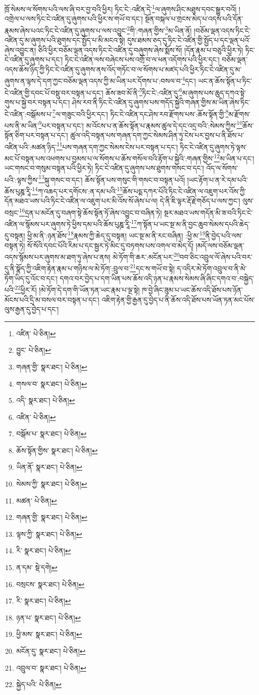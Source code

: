 ཁྲོ་སེམས་ལ་སོགས་པའི་ལས་ཞི་བར་བྱ་བའི་ཕྱིར། ཏིང་ངེ་:འཛིན་དེ་\footnote{འཛིན་  པེ་ཅིན། }ལ་ཞུགས་ཤིང་མཐུས་དབང་སྒྱུར་བའོ། །འགྲེལ་པ་ལས་ཏིང་ངེ་འཛིན་དུ་ཞུགས་པའི་ཕྱིར་ས་གཡོ་བ་དང་། སྔོན་བསྐལ་པ་གྲངས་མེད་པ་འདས་པའི་དོན་རྣམས་ཞེས་པའང་ཏིང་ངེ་འཛིན་དུ་ཞུགས་པ་ལས་འབྱུང་\footnote{བྱུང་  པེ་ཅིན། }གི་:གཞན་གྱིས་\footnote{གཞན་གྱི་  སྣར་ཐང་།  པེ་ཅིན། }མ་ཡིན་ནོ། །བཅོམ་ལྡན་འདས་ཏིང་ངེ་འཛིན་དུ་མ་ཞུགས་པའི་ཐུགས་དང་སྤྱོད་པ་མི་མངའ་སྟེ། དུས་ཐམས་ཅད་དུ་ཏིང་ངེ་འཛིན་གྱི་སྤྱོད་པ་དང་ལྡན་པའོ་ཞེས་འབྱུང་ན། ཅིའི་ཕྱིར་བཅོམ་ལྡན་འདས་ཏིང་ངེ་འཛིན་དུ་བཞུགས་ཞེས་སྨོས་སོ། །དོན་རྣམ་པ་བཅུའི་ཕྱིར་ཏེ། ཏིང་ངེ་འཛིན་དུ་ཞུགས་པ་དང་། ཏིང་ངེ་འཛིན་ལས་བཞེངས་པས་འགྲོ་བ་ལ་ཕན་འདོགས་པའི་ཕྱིར་དང་། བཅོམ་ལྡན་འདས་ཆོས་ཉིད་ཀྱི་ཏིང་ངེ་འཛིན་དུ་ཞུགས་ནས་འོད་གཏོང་བ་ལ་སོགས་པ་མཛད་པའི་ཕྱིར་ཏིང་ངེ་འཛིན་དུ་མ་ཞུགས་ན་ལྟས་དེ་དག་ཀྱང་བཅོམ་ལྡན་འདས་ཀྱི་མ་ཡིན་པར་དོགས་པ་:བསལ་བ་\footnote{གསལ་བ་  སྣར་ཐང་།  པེ་ཅིན། }དང་། ཡང་ན་ཆོས་སྟོན་པ་ཏིང་ངེ་འཛིན་གྱི་དབང་པོ་བསྡུ་བར་བསྟན་པ་དང་། ཆོས་ཟབ་མོ་ནི་\footnote{འདི་  སྣར་ཐང་།  པེ་ཅིན། }ཏིང་ངེ་:འཛིན་དུ་\footnote{འཛིན་  པེ་ཅིན། }མ་ཞུགས་པས་ཆུད་དཀའ་སྟེ་གུས་པ་སྐྱེ་བར་བསྟན་པ་དང་། ཤེས་རབ་ནི་ཏིང་ངེ་འཛིན་དུ་ཞུགས་པས་གདོད་སྐྱེའི་གཞན་གྱིས་མ་ཡིན་ཞེས་ཏིང་ངེ་འཛིན་:བསྒོམས་པ་\footnote{བསྒོམ་པ་  སྣར་ཐང་།  པེ་ཅིན། }ལ་གཟུང་བའི་ཕྱིར་དང་། ཏིང་ངེ་འཛིན་དང་ཤེས་རབ་རྫོགས་པས་:ཆོས་སྟོན་གྱི་\footnote{ཆོས་སྟོན་གྱིས་  སྣར་ཐང་།  པེ་ཅིན། }མ་རྫོགས་པས་ནི་མ་ཡིན་\footnote{ཡིན་ནོ་  སྣར་ཐང་།  པེ་ཅིན། }པར་བསྟན་པ་དང་། མ་འོངས་པ་ན་ཆོས་སྟོན་པ་རྣམས་ཚུལ་དེ་དང་འདྲ་བའི་:སེམས་ཀྱིས་\footnote{སེམས་ཀྱི་  སྣར་ཐང་།  པེ་ཅིན། }ཆོས་སྟོན་ཅིག་པར་བསྟན་པ་དང་། ཚུལ་འདི་བསྟན་པས་གཞན་དག་ཀྱང་སེམས་ཤིན་ཏུ་ངེས་པར་བྱས་པ་ནི་ཐོས་པ་འཛིན་པའི་:མཚན་ཉིད་\footnote{མཚན་  པེ་ཅིན། }པས་གཞན་དག་ཀྱང་སེམས་ངེས་པར་བསྟན་པ་དང་། ཏིང་ངེ་འཛིན་དུ་ཞུགས་ཏེ་ལྟས་མང་པོ་བསྟན་པས་འཕགས་པ་བྱམས་པ་ལ་སོགས་པ་ཆོས་གསོལ་བའི་རྟོག་པ་སྐྱེའི་:གཞན་གྱིས་\footnote{གཞན་གྱི་  སྣར་ཐང་།  པེ་ཅིན། }མ་ཡིན་པ་དང་། ཡང་གསང་བ་གསུམ་བསྟན་པའི་ཕྱིར་ཏེ། ཏིང་ངེ་འཛིན་དུ་ཞུགས་པས་ཐུགས་གསང་བ་དང་། འོད་ལ་སོགས་པའི་:ལྟས་ཀྱིས་\footnote{ལྟས་ཀྱི་  སྣར་ཐང་།  པེ་ཅིན། }སྐུ་གསང་བ་དང་། ཆོས་སྟོན་པས་གསུང་གི་གསང་བ་བསྟན་པའོ། །ཡང་རྟོག་པ་ན་རེ་དམ་པའི་ཆོས་པུཎྜ་རཱི་\footnote{རི་  སྣར་ཐང་།  པེ་ཅིན། }ཀ་འཆད་པར་དགོངས་:ན་དམ་པའི་\footnote{ན་དམ་  སྡེ་དགེ། }ཆོས་པདྨ་དཀར་པོའི་ཏིང་ངེ་འཛིན་ལ་འཇུག་པར་འོས་ཀྱི་དོན་མཐའ་ཡས་པའི་ཏིང་ངེ་འཛིན་ལ་འཇུག་པར་མི་འོས་སོ་ཞེས་པ་ལ། དེ་ནི་ཇི་ལྟར་རྡོ་རྗེ་གཅོད་པ་ལས་ཀྱང་། ལུས་བསྲང་\footnote{བསྲངས་  སྣར་ཐང་།  པེ་ཅིན། }དྲན་པ་མངོན་དུ་བཞག་སྟེ་ཆོས་སྟོན་ཏོ་ཞེས་འབྱུང་བ་བཞིན་ཏེ། སྔར་མཐའ་ཡས་གདོན་མི་ཟ་བའི་ཏིང་ངེ་འཛིན་ལ་སྙོམས་པར་ཞུགས་ཏེ་ཕྱིས་དམ་པའི་ཆོས་པུཎྜ་རཱི་\footnote{རི་  སྣར་ཐང་།  པེ་ཅིན། }ཀ་སྟོན་པ་ཡང་སྔ་མ་ནི་བྱང་ཆུབ་སེམས་དཔའི་ཆེད་དུ་བསྟན། ཕྱི་མ་ནི་:ཉན་ཐོས་\footnote{ཉན་པ་  སྣར་ཐང་།  པེ་ཅིན། }རྣམས་ཀྱི་ཆེད་དུ་བསྟན། ཡང་སྔ་མ་ནི་རང་བཞིན། :ཕྱི་མ་\footnote{ཕྱི་མས་  སྣར་ཐང་།  པེ་ཅིན། }ནི་བྱེད་པའི་ལས་བསྟན་ཏེ། སོ་སོའི་དབང་པོའི་རིམ་པ་དང་སྦྱར་ཏེ་མིང་དུ་བཏགས་པས་འགལ་བ་མེད་དོ། །མདོ་ལས་བཅོམ་ལྡན་འདས་སྙོམས་པར་ཞུགས་མ་ཐག་ཏུ་ཞེས་པ་ནས། མེ་ཏོག་གི་ཆར་:མངོན་པར་\footnote{མངོན་དུ་  སྣར་ཐང་།  པེ་ཅིན། }བབ་ཅིང་འབྲུལ་ལོ་ཞེས་པའི་བར་དུ་ནི་སྣོད་ཀྱི་འཇིག་རྟེན་རྣམ་པ་གཉིས་ལ་མེ་ཏོག་:བྲུལ་བ་\footnote{འབྲུལ་བ་  སྣར་ཐང་།  པེ་ཅིན། }དང་ས་གཡོ་བ་སྟེ། ད་འདིར་མེ་ཏོག་འབྲུལ་བ་ནི་མེ་ཏོག་ཡིད་དུ་འོང་བ་དང་། དགའ་བར་བྱེད་པ་དག་ཡིན་པས་ཆོས་འདི་ཉན་པ་རྣམས་སེམས་ཞི་ཞིང་དགའ་བ་:བསྐྱེད་པའི་\footnote{སྐྱེད་པའི་  པེ་ཅིན། }ཕྱིར་རོ། །མེ་ཏོག་དེ་དག་གི་ཡོན་ཏན་ཡང་རྣམ་པ་ལྔ་སྟེ། ཁ་བྱེ་ཞིང་ཟུམ་པ་ཡང་ཆོས་འདི་ཐོས་པས་ཉོན་མོངས་པའི་དྲི་མ་བསལ་བར་བསྟན་པ་དང་། འཇིག་རྟེན་གྱི་རྒྱན་དུ་བྱེད་པ་ནི་ཆོས་འདི་ཐོས་པས་ཡོན་ཏན་མང་པོས་ལུས་རྒྱན་དུ་བྱེད་པ་དང་། 